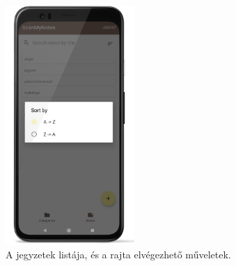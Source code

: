 \begin{figure}[!ht]
	\includegraphics[width=49mm, keepaspectratio]{figures/notelist_sort.png}
	\caption{A jegyzetek listája, és a rajta elvégezhető műveletek.}
	\label{fig:NoteListScreen2}
\end{figure}
\newpage
